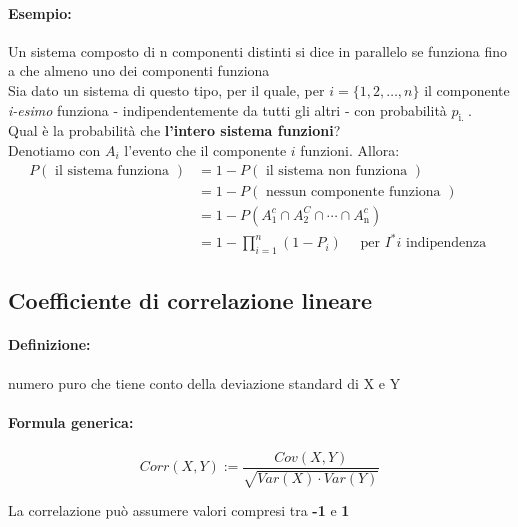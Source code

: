 \documentclass[]{article}
\newcommand{\definizione}{\paragraph{Definizione:}}
\newcommand{\formula}{\paragraph{Formula generica:}}
\begin{document}
    \paragraph{Esempio:} Un sistema composto di n componenti distinti si dice in parallelo se funziona fino a che almeno uno dei componenti funziona \\
    Sia dato un sistema di questo tipo, per il quale, per $i=\{1,2, \ldots, n\}$ il componente \textit{i-esimo} funziona - indipendentemente da tutti gli altri - con probabilità $p_{\text {i. }}$. \\
    Qual è la probabilità che \textbf{l'intero sistema funzioni}? \\
    Denotiamo con $A_i$ l'evento che il componente $i$ funzioni. Allora:
    $$
    \begin{aligned}
    P(\text { il sistema funziona }) & =1-P(\text { il sistema non funziona }) \\
    & =1-P(\text { nessun componente funziona }) \\
    & =1-P\left(A_1^c \cap A_2^C \cap \cdots \cap A_{\mathrm{n}}^c\right) \\
    & =1-\prod_{i=1}^n\left(1-P_i\right) \quad \text { per } I^* i \text { indipendenza }
    \end{aligned}
    $$
    
    \subsection{Coefficiente di correlazione lineare}
    \definizione numero puro che tiene conto della deviazione standard di X e Y
    \formula
    \begin{equation*}
        Corr(X,Y) := \frac{Cov(X,Y)}{\sqrt{Var(X) \cdot Var(Y)}}
    \end{equation*}

    \begin{center}
        La correlazione può assumere valori compresi tra \textbf{-1} e \textbf{1}
    \end{center}
     \\
     \\
     \\

    \newpage
\end{document}
